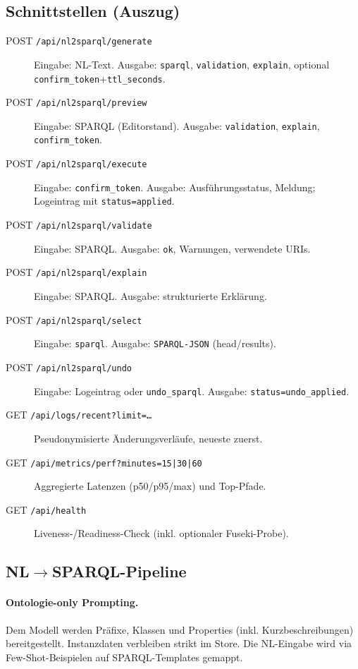 \subsection{Schnittstellen (Auszug)}
\begin{description}
  \item[POST \texttt{/api/nl2sparql/generate}] Eingabe: NL-Text. Ausgabe: \texttt{sparql}, \texttt{validation}, \texttt{explain}, optional \texttt{confirm\_token}+\texttt{ttl\_seconds}.
  \item[POST \texttt{/api/nl2sparql/preview}] Eingabe: SPARQL (Editorstand). Ausgabe: \texttt{validation}, \texttt{explain}, \texttt{confirm\_token}.
  \item[POST \texttt{/api/nl2sparql/execute}] Eingabe: \texttt{confirm\_token}. Ausgabe: Ausführungsstatus, Meldung; Logeintrag mit \texttt{status=applied}.
  \item[POST \texttt{/api/nl2sparql/validate}] Eingabe: SPARQL. Ausgabe: \texttt{ok}, Warnungen, verwendete URIs.
  \item[POST \texttt{/api/nl2sparql/explain}] Eingabe: SPARQL. Ausgabe: strukturierte Erklärung.
  \item[POST \texttt{/api/nl2sparql/select}] Eingabe: \texttt{sparql}. Ausgabe: \texttt{SPARQL-JSON} (head/results).
  \item[POST \texttt{/api/nl2sparql/undo}] Eingabe: Logeintrag oder \texttt{undo\_sparql}. Ausgabe: \texttt{status=undo\_applied}.
  \item[GET \texttt{/api/logs/recent?limit=\dots}] Pseudonymisierte Änderungsverläufe, neueste zuerst.
  \item[GET \texttt{/api/metrics/perf?minutes=15|30|60}] Aggregierte Latenzen (p50/p95/max) und Top-Pfade.
  \item[GET \texttt{/api/health}] Liveness-/Readiness-Check (inkl. optionaler Fuseki-Probe).
\end{description}

\subsection{NL$\rightarrow$SPARQL-Pipeline}
\paragraph{Ontologie-only Prompting.}
Dem Modell werden Präfixe, Klassen und Properties (inkl. Kurzbeschreibungen) bereitgestellt. Instanzdaten verbleiben strikt im Store. Die NL-Eingabe wird via Few-Shot-Beispielen auf SPARQL-Templates gemappt.

